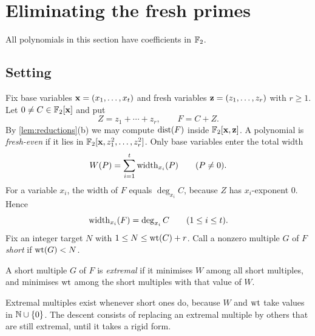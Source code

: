 \section{Eliminating the fresh primes}\label{sec:descent}

All polynomials in this section have coefficients in $\mathbb{F}_2$.

\subsection{Setting}
Fix base variables $\mathbf{x}=(x_1,\dots,x_t)$ and fresh variables $\mathbf{z}=(z_1,\dots,z_r)$ with $r\ge1$. Let $0\ne C\in\mathbb{F}_2[\mathbf{x}]$ and put
\[
 Z=z_1+\cdots+z_r,\qquad F=C+Z.
\]
By \cref{lem:reductions}(b) we may compute $\operatorname{dist}(F)$ inside $\mathbb{F}_2[\mathbf{x},\mathbf{z}]$. A polynomial is \emph{fresh-even} if it lies in $\mathbb{F}_2[\mathbf{x},z_1^2,\dots,z_r^2]$. Only base variables enter the total width
\[
 W(P)=\sum_{i=1}^t\operatorname{width}_{x_i}(P)\qquad(P\ne0).
\]
For a variable $x_i$, the width of $F$ equals $\deg_{x_i}C$, because $Z$ has $x_i$-exponent $0$. Hence
\begin{equation}\label{eq:widthF}
 \operatorname{width}_{x_i}(F)=\deg_{x_i}C\qquad(1\le i\le t).
\end{equation}
Fix an integer target $N$ with $1\le N\le\operatorname{wt}(C)+r$. Call a nonzero multiple $G$ of $F$ \emph{short} if $\operatorname{wt}(G)<N$.

\begin{definition}\label{def:extremal}
A short multiple $G$ of $F$ is \emph{extremal} if it minimises $W$ among all short multiples, and minimises $\operatorname{wt}$ among the short multiples with that value of $W$.
\end{definition}

Extremal multiples exist whenever short ones do, because $W$ and $\operatorname{wt}$ take values in $\mathbb{N}\cup\{0\}$. The descent consists of replacing an extremal multiple by others that are still extremal, until it takes a rigid form.

